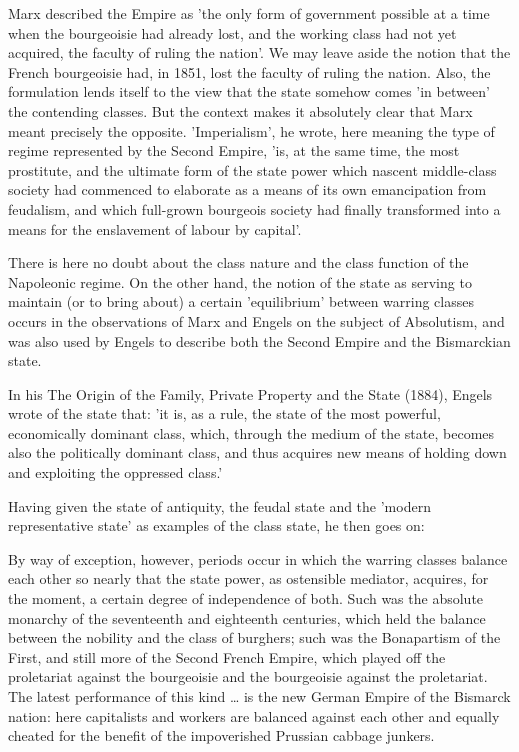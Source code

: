 Marx described the Empire as 'the only form of government possible at a time when the bourgeoisie had already lost, and the working class had not yet acquired, the faculty of ruling the nation'. We may leave aside the notion that the French bourgeoisie had, in 1851, lost the faculty of ruling the nation. Also, the formulation lends itself to the view that the state somehow comes 'in between' the contending classes. But the context makes it absolutely clear that Marx meant precisely the opposite. 'Imperialism', he wrote, here meaning the type of regime represented by the Second Empire, 'is, at the same time, the most prostitute, and the ultimate form of the state power which nascent middle-class society had commenced to elaborate as a means of its own emancipation from feudalism, and which full-grown bourgeois society had finally transformed into a means for the enslavement of labour by capital'.

There is here no doubt about the class nature and the class function of the Napoleonic regime. On the other hand, the notion of the state as serving to maintain (or to bring about) a certain 'equilibrium' between warring classes occurs in the observations of Marx and Engels on the subject of Absolutism, and was also used by Engels to describe both the Second Empire and the Bismarckian state.

In his The Origin of the Family, Private Property and the State (1884), Engels wrote of the state that: 'it is, as a rule, the state of the most powerful, economically dominant class, which, through the medium of the state, becomes also the politically dominant class, and thus acquires new means of holding down and exploiting the oppressed class.'

Having given the state of antiquity, the feudal state and the 'modern representative state' as examples of the class state, he then goes on:
\begin{displayquote}
    By way of exception, however, periods occur in which the warring classes balance each other so nearly that the state power, as ostensible mediator, acquires, for the moment, a certain degree of independence of both. Such was the absolute monarchy of the seventeenth and eighteenth centuries, which held the balance between the nobility and the class of burghers; such was the Bonapartism of the First, and still more of the Second French Empire, which played off the proletariat against the bourgeoisie and the bourgeoisie against the proletariat. The latest performance of this kind \dots{} is the new German Empire of the Bismarck nation: here capitalists and workers are balanced against each other and equally cheated for the benefit of the impoverished Prussian cabbage junkers.
\end{displayquote}

